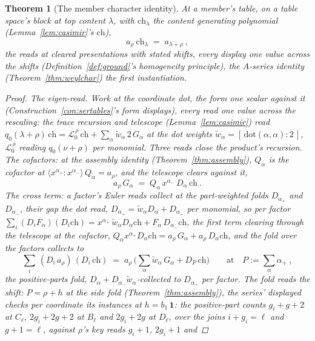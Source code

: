 \documentclass[11pt]{article}
\newtheorem{theorem}{Theorem}
\theoremstyle{definition}
\begin{document}
\begin{theorem}[The member character identity]\label{thm:memberchar}
At a member's table, on a table space's block at top
content $\lambda$, with $\mathrm{ch}_\lambda$ the content
generating polynomial (Lemma~\ref{lem:casimir}'s $\mathrm{ch}$),
\[
a_\rho\ \mathrm{ch}_\lambda\;=\;a_{\lambda+\rho}\ ,
\]
the reads at cleared presentations with stated shifts, every
display one value across the shifts (Definition~\ref{def:ground}'s
homogeneity principle), the $A$-series identity
(Theorem~\ref{thm:weylchar}) the first instantiation.
\begin{proof}
\emph{The eigen-read.} Work at the coordinate dot, the form one
scalar against it (Construction~\ref{con:sertables}'s form
displays), every read one value across the rescaling: the trace
recursion and telescope (Lemma~\ref{lem:casimir}) read
$q_0(\lambda{+}\rho)\,\mathrm{ch}=\mathcal L_0^{\,\rho}\,
\mathrm{ch}+\sum_\alpha\tilde w_\alpha\,2\,G_\alpha$ at the dot
weights $\tilde w_\alpha=[\,\mathrm{dot}(\alpha,\alpha):2\,]$,
$\mathcal L_0^{\,\rho}$ reading $q_0(\nu{+}\rho)$ per monomial.
Three reads close the product's recursion. The \emph{cofactors}:
at the assembly identity (Theorem~\ref{thm:assembly}),
$Q_\alpha$ is the cofactor at
$\langle x^{\alpha_+}\!:\!x^{\alpha_-}\rangle\,Q_\alpha=a_\rho$,
and the telescope clears against it,
\[
a_\rho\,G_\alpha\;=\;Q_\alpha\,x^{\alpha_-}\,D_\alpha\,
\mathrm{ch}\ .
\]
The \emph{cross term}: a factor's Euler reads collect at the
part-weighted folds $D_{\alpha_+}$ and $D_{\alpha_-}$, their gap
the dot read, $D_{\alpha_+}=\tilde w_\alpha D_\alpha
+D_{\alpha_-}$ per monomial, so per factor
$\sum_i(D_iF_\alpha)(D_i\mathrm{ch})
=x^{\alpha_+}\,\tilde w_\alpha D_\alpha\mathrm{ch}
+F_\alpha\,D_{\alpha_-}\mathrm{ch}$, the first term clearing
through the telescope at the cofactor,
$Q_\alpha x^{\alpha_+}D_\alpha\mathrm{ch}
=a_\rho\,G_\alpha+a_\rho\,D_\alpha\mathrm{ch}$, and the fold over
the factors collects to
\[
\sum_i\,(D_i\,a_\rho)\,(D_i\,\mathrm{ch})
\;=\;a_\rho\,\Big(\sum_\alpha\tilde w_\alpha\,G_\alpha
+D_P\,\mathrm{ch}\Big)
\qquad\text{at}\quad P:=\sum_\alpha\alpha_+\ ,
\]
the positive-parts fold, $D_\alpha+D_{\alpha_-}
\tilde w_\alpha$-collected to $D_{\alpha_+}$ per factor. The
\emph{fold reads the shift}: $P=\rho+h$ at the side fold
(Theorem~\ref{thm:assembly}), the series' displayed checks per
coordinate its instances at $h=b_1\,\mathbf 1$:
the positive-part counts $g_i+g+2$ at $C_\ell$, $2g_i+2g+2$ at
$B_\ell$ and $2g_i+2g$ at $D_\ell$, over the joins $i+g_i=\ell$
and $g+1=\ell$, against $\rho$'s key reads $g_i+1$, $2g_i+1$ and

\end{proof}
\end{theorem}
\end{document}
